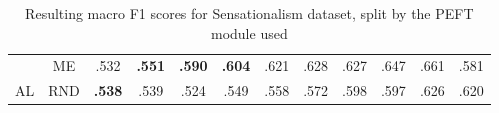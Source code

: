 \begin{table}[htbp]
\begin{subtable}{\linewidth}
\begin{tabular}{c|c|cccccccccc}
 & ME & .532 & \textbf{.551} & \textbf{.590} & \textbf{.604} & .621 & .628 & .627 & .647 & .661 & .581\\

\multirow{-3}{*}{\raggedright\arraybackslash AL} & RND & \textbf{.538} & .539 & .524 & .549 & .558 & .572 & .598 & .597 & .626 & .620\\
\bottomrule
\end{tabular}
\end{subtable}
\caption{Resulting macro F1 scores for Sensationalism dataset, split by the PEFT module used}
\label{tab:results_short_sensation_10}
\end{table}
